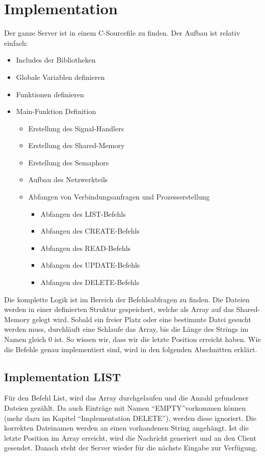 \documentclass[12pt,a4paper,ngerman]{report}
\begin{document}
\section{Implementation}
Der ganze Server ist in einem C-Sourcefile zu finden. Der Aufbau ist relativ einfach:
\begin{itemize}
	\item Includes der Bibliotheken
	\item Globale Variablen definieren
	\item Funktionen definieren
	\item Main-Funktion Definition
		\begin{itemize}
		\item Erstellung des Signal-Handlers
		\item Erstellung des Shared-Memory
		\item Erstellung des Semaphors
		\item Aufbau des Netzwerkteils
		\item Abfangen von Verbindungsanfragen und Prozesserstellung
			\begin{itemize}
			\item Abfangen des LIST-Befehls
			\item Abfangen des CREATE-Befehls
			\item Abfangen des READ-Befehls
			\item Abfangen des UPDATE-Befehls
			\item Abfangen des DELETE-Befehls
			\end{itemize}
		\end{itemize}
\end{itemize}
Die komplette Logik ist im Bereich der Befehlsabfragen zu finden. Die Dateien werden in einer definierten Struktur gespeichert, welche als Array auf das Shared-Memory gelegt wird. Sobald ein freier Platz oder eine bestimmte Datei gesucht werden muss, durchläuft eine Schlaufe das Array, bis die Länge des Strings im Namen gleich 0 ist. So wissen wir, dass wir die letzte Position erreicht haben. Wie die Befehle genau implementiert sind, wird in den folgenden Abschnitten erklärt.
\subsection{Implementation LIST}
Für den Befehl List, wird das Array durchgelaufen und die Anzahl gefundener Dateien gezählt. Da auch Einträge mit Namen \textquotedblleft EMPTY\textquotedblright vorkommen können (mehr dazu im Kapitel \textquotedblleft Implementation DELETE\textquotedblright), werden diese ignoriert. Die korrekten Dateinamen werden an einen vorhandenen String angehängt. Ist die letzte Position im Array erreicht, wird die Nachricht generiert und an den Client gesendet. Danach steht der Server wieder für die nächste Eingabe zur Verfügung.
\end{document}
